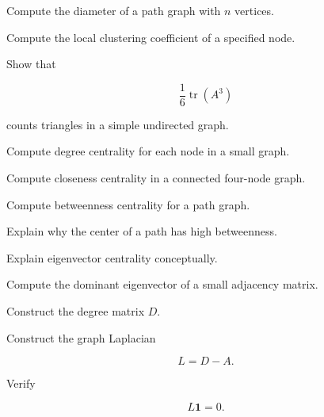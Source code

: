 \begin{exercise}[2]
Compute the diameter of a path graph with \(n\) vertices.
\end{exercise}

\begin{exercise}[2]
Compute the local clustering coefficient of a specified node.
\end{exercise}

\begin{exercise}[3]
Show that

\[
\frac16\operatorname{tr}(A^3)
\]

counts triangles in a simple undirected graph.
\end{exercise}

\begin{exercise}[2]
Compute degree centrality for each node in a small graph.
\end{exercise}

\begin{exercise}[2]
Compute closeness centrality in a connected four-node graph.
\end{exercise}

\begin{exercise}[3]
Compute betweenness centrality for a path graph.
\end{exercise}

\begin{exercise}[3]
Explain why the center of a path has high betweenness.
\end{exercise}

\begin{exercise}[2]
Explain eigenvector centrality conceptually.
\end{exercise}

\begin{exercise}[3]
Compute the dominant eigenvector of a small adjacency matrix.
\end{exercise}

\begin{exercise}[2]
Construct the degree matrix \(D\).
\end{exercise}

\begin{exercise}[2]
Construct the graph Laplacian

\[
L=D-A.
\]
\end{exercise}

\begin{exercise}[3]
Verify

\[
L\mathbf{1}=0.
\]
\end{exercise}

